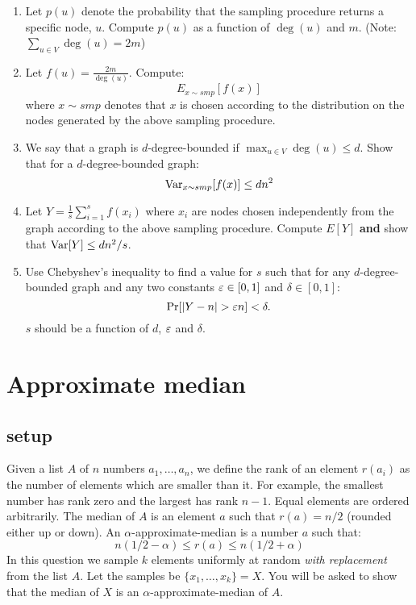 \documentclass{article}
\begin{document}
\begin{enumerate}
\item Let $p(u)$ denote the probability that the sampling procedure returns a specific
node, $u$. Compute $p(u)$ as a function of $\deg(u)$ and $m$. (Note:
$\sum_{u \in V} \deg(u) = 2m$)
\item Let $f(u) = \frac{2m}{\deg(u)}$. Compute:
\[
E_{x \sim smp} [f(x)]
\]
where $x \sim smp$ denotes that $x$ is chosen according to the
distribution on the nodes generated by the above sampling procedure.
\item We say that a graph is $d$-degree-bounded if $\max_{u \in V} \deg(u) \le
d$. Show that for a $d$-degree-bounded graph:
\[
{\operatorname{Var}}_{x \sim smp} [f(x)] \le dn^2
\]
\item Let $Y = \frac{1}{s}\sum_{i=1}^{s} f(x_i)$ where $x_i$ are
nodes chosen independently from the graph according to the above
sampling procedure. Compute $E[Y]$ {\bf and} show that ${\operatorname{Var}}[Y] \le
dn^2/s$.
\item Use Chebyshev's inequality to find a value for $s$ such that 
for any $d$-degree-bounded graph and any two constants $\varepsilon \in
[0,1]$ and $\delta \in [0,1]$:
\[
\Pr[|Y - n| > \varepsilon n ] < \delta.
\]
$s$ should be a function of $d$, $\varepsilon$ and $\delta$.

\end{enumerate}
\pagebreak






\section{Approximate median}
\subsection*{setup}
Given a list $A$ of $n$ numbers $a_1,\ldots,a_n$, we define the rank
of an element $r(a_i)$ as the number of elements which are smaller
than it. For example, the smallest number has rank zero and the
largest has rank $n-1$. Equal elements are ordered arbitrarily. The
median of $A$ is an element $a$ such that $r(a) = n/2$ (rounded
either up or down). An $\alpha$-approximate-median is a number $a$
such that:
\[
n(1/2 - \alpha) \le r(a) \le n(1/2 + \alpha)
\]
In this question we sample $k$ elements uniformly at random {\it
with replacement} from the list $A$. Let the samples be
$\{x_1,\ldots,x_k\} = X$. You will be asked to show that the median of
$X$ is an $\alpha$-approximate-median of $A$.
\end{document}
